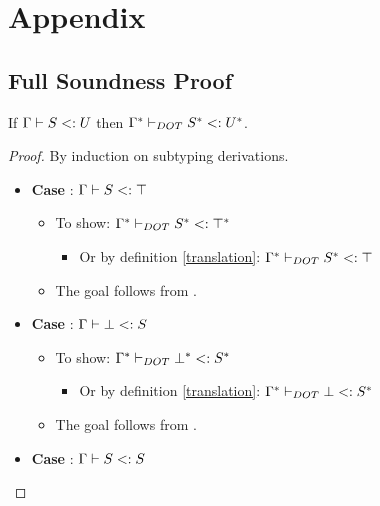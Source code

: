 \appendix

\section{Appendix}

\subsection{Full Soundness Proof}
\label{full_proofs}

\begin{LEMMA}
    \label{pres_subtyping}
    If $\Gamma \vdash S <: U$ then $\Gamma^{*} \vdash_{DOT} S^{*} <: U^{*}$.
\end{LEMMA}

\begin{proof}
    By induction on subtyping derivations.
    \begin{itemize}
        \item \textbf{Case} : $\Gamma \vdash S <: \top$
        \begin{itemize}
            \item To show: $\Gamma^{*} \vdash_{DOT} S^{*} <: \top^{*}$
            \begin{itemize}
                \item Or by definition \ref{translation}:
                    $\Gamma^{*} \vdash_{DOT} S^{*} <: \top$
            \end{itemize}
            \item The goal follows from .
        \end{itemize}
        \item \textbf{Case} : $\Gamma \vdash \bot <: S$
        \begin{itemize}
            \item To show: $\Gamma^{*} \vdash_{DOT} \bot^{*} <: S^{*}$
            \begin{itemize}
                \item Or by definition \ref{translation}:
                    $\Gamma^{*} \vdash_{DOT} \bot <: S^{*}$
            \end{itemize}
            \item The goal follows from .
        \end{itemize}
        \item \textbf{Case} : $\Gamma \vdash S <: S$
        \begin{itemize}

\end{itemize}
\end{itemize}
\end{proof}
